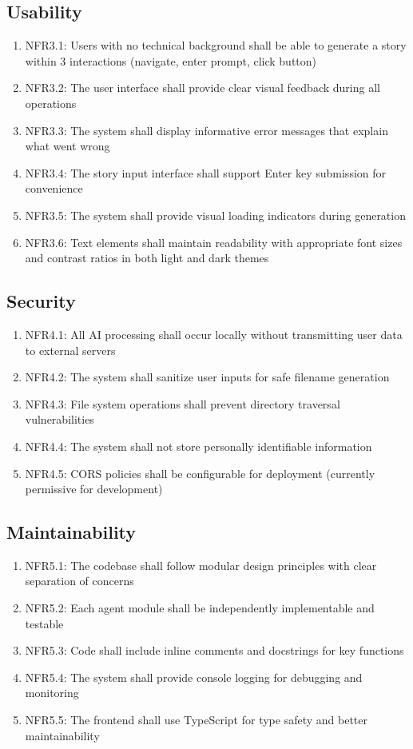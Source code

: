 \subsection{Usability}
\begin{enumerate}
    \item NFR3.1: Users with no technical background shall be able to generate a story within 3 interactions (navigate, enter prompt, click button)
    \item NFR3.2: The user interface shall provide clear visual feedback during all operations
    \item NFR3.3: The system shall display informative error messages that explain what went wrong
    \item NFR3.4: The story input interface shall support Enter key submission for convenience
    \item NFR3.5: The system shall provide visual loading indicators during generation
    \item NFR3.6: Text elements shall maintain readability with appropriate font sizes and contrast ratios in both light and dark themes
\end{enumerate}

\subsection{Security}
\begin{enumerate}
    \item NFR4.1: All AI processing shall occur locally without transmitting user data to external servers
    \item NFR4.2: The system shall sanitize user inputs for safe filename generation
    \item NFR4.3: File system operations shall prevent directory traversal vulnerabilities
    \item NFR4.4: The system shall not store personally identifiable information
    \item NFR4.5: CORS policies shall be configurable for deployment (currently permissive for development)
\end{enumerate}

\subsection{Maintainability}
\begin{enumerate}
    \item NFR5.1: The codebase shall follow modular design principles with clear separation of concerns
    \item NFR5.2: Each agent module shall be independently implementable and testable
    \item NFR5.3: Code shall include inline comments and docstrings for key functions
    \item NFR5.4: The system shall provide console logging for debugging and monitoring
    \item NFR5.5: The frontend shall use TypeScript for type safety and better maintainability
\end{enumerate}

